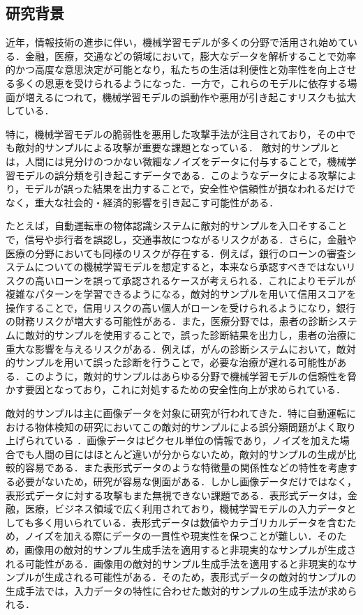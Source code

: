 \subsection{研究背景}
近年，情報技術の進歩に伴い，機械学習モデルが多くの分野で活用され始めている．金融，医療，交通などの領域において，膨大なデータを解析することで効率的かつ高度な意思決定が可能となり，私たちの生活は利便性と効率性を向上させる多くの恩恵を受けられるようになった．一方で，これらのモデルに依存する場面が増えるにつれて，機械学習モデルの誤動作や悪用が引き起こすリスクも拡大している．

特に，機械学習モデルの脆弱性を悪用した攻撃手法が注目されており，その中でも敵対的サンプルによる攻撃が重要な課題となっている\cite{MBSD-AdversarialTraining}．
敵対的サンプルとは，人間には見分けのつかない微細なノイズをデータに付与することで，機械学習モデルの誤分類を引き起こすデータである\cite{MBSD-AdversarialExample}．このようなデータによる攻撃により，モデルが誤った結果を出力することで，安全性や信頼性が損なわれるだけでなく，重大な社会的・経済的影響を引き起こす可能性がある．

たとえば，自動運転車の物体認識システムに敵対的サンプルを入口そすることで，信号や歩行者を誤認し，交通事故につながるリスクがある\cite{AdversarialMachineLearning:BayesianPerspectives}．さらに，金融や医療の分野においても同様のリスクが存在する．例えば，銀行のローンの審査システムについての機械学習モデルを想定すると，本来なら承認すべきではないリスクの高いローンを誤って承認されるケースが考えられる．これによりモデルが複雑なパターンを学習できるようになる，敵対的サンプルを用いて信用スコアを操作することで，信用リスクの高い個人がローンを受けられるようになり，銀行の財務リスクが増大する可能性がある．また，医療分野では，患者の診断システムに敵対的サンプルを使用することで，誤った診断結果を出力し，患者の治療に重大な影響を与えるリスクがある．例えば，がんの診断システムにおいて，敵対的サンプルを用いて誤った診断を行うことで，必要な治療が遅れる可能性がある．このように，敵対的サンプルはあらゆる分野で機械学習モデルの信頼性を脅かす要因となっており，これに対処するための安全性向上が求められている．

敵対的サンプルは主に画像データを対象に研究が行われてきた．特に自動運転における物体検知の研究においてこの敵対的サンプルによる誤分類問題がよく取り上げられている
\cite{MBSD-automobile}．画像データはピクセル単位の情報であり，ノイズを加えた場合でも人間の目にはほとんど違いが分からないため，敵対的サンプルの生成が比較的容易である．また表形式データのような特徴量の関係性などの特性を考慮する必要がないため，研究が容易な側面がある．しかし画像データだけではなく，表形式データに対する攻撃もまた無視できない課題である．表形式データは，金融，医療，ビジネス領域で広く利用されており，機械学習モデルの入力データとしても多く用いられている．表形式データは数値やカテゴリカルデータを含むため，ノイズを加える際にデータの一貫性や現実性を保つことが難しい．そのため，画像用の敵対的サンプル生成手法を適用すると非現実的なサンプルが生成される可能性がある．画像用の敵対的サンプル生成手法を適用すると非現実的なサンプルが生成される可能性がある．そのため，表形式データの敵対的サンプルの生成手法では，入力データの特性に合わせた敵対的サンプルの生成手法が求められる．

